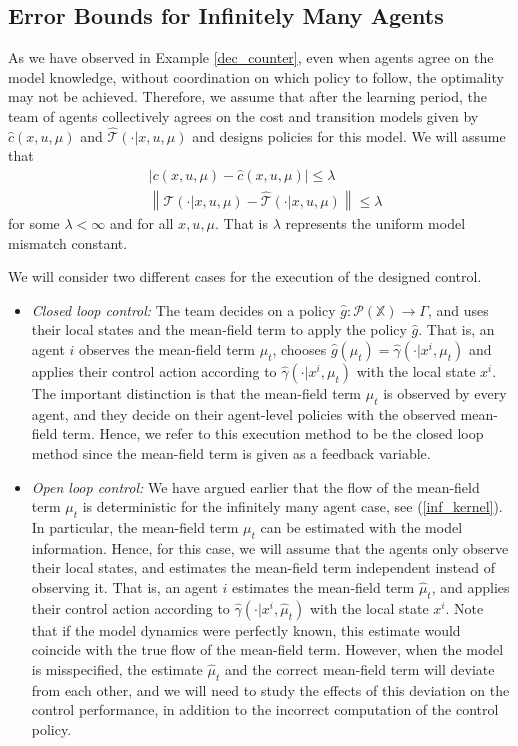 \documentclass[twoside,11pt]{article}
\def\P{{\mathcal P}}
\begin{document}
\subsection{Error Bounds for Infinitely Many Agents} 
As we have observed in Example \ref{dec_counter}, even when agents agree on the model knowledge, without coordination on which policy to follow, the optimality may not be achieved. Therefore, we assume that after the learning period, the team of agents collectively agrees on the cost and transition models given by $\hat{c}(x,u,\mu)$ and $\hat{\mathcal{T}}(\cdot|x,u,\mu)$ and
designs policies for this model. We will assume that 
\begin{align}\label{miss}
&\left|c(x,u,\mu)-\hat{c}(x,u,\mu)\right| \leq \lambda\nonumber\\
& \left\|\mathcal{T}(\cdot|x,u,\mu) - \hat{\mathcal{T}}(\cdot|x,u,\mu) \right\| \leq \lambda
\end{align}
for some $\lambda<\infty$ and for all $x,u,\mu$. That is $\lambda$ represents the uniform model mismatch constant.

We will consider two different cases for the execution of the designed control.
\begin{itemize}
\item {\it Closed loop control:} The team decides on a policy $\hat{g}:\P(\mathds{X}) \to \Gamma$, and uses their local states and the mean-field term to apply the policy $\hat{g}$. That is, an agent $i$ observes the mean-field term $\mu_t$, chooses $\hat{g}(\mu_t) = \hat{\gamma}(\cdot|x^i,\mu_t)$ and applies their control action according to $\hat{\gamma}(\cdot|x^i,\mu_t)$ with the local state $x^i$. The important distinction is that the mean-field term $\mu_t$ is observed by every agent, and they decide on their agent-level policies with the observed mean-field term. Hence, we refer to this execution method to be the closed loop method since the mean-field term is given as a feedback variable.
\item {\it Open loop control:} We have argued earlier that the flow of the mean-field term $\mu_t$ is deterministic for the infinitely many agent case, see (\ref{inf_kernel}). In particular, the mean-field term $\mu_t$ can be estimated with the model information. Hence, for this case, we will assume that the agents only observe their local states, and estimates the mean-field term independent instead of observing it. That is, an agent $i$ estimates the mean-field term $\hat{\mu}_t$, and applies their control action according to $\hat{\gamma}(\cdot|x^i,\hat{\mu}_t)$ with the local state $x^i$. Note that if the model dynamics were perfectly known, this estimate would coincide with the true flow of the mean-field term. However, when the model is misspecified, the estimate $\hat{\mu}_t$ and the correct mean-field term will deviate from each other, and we will need to study the effects of this deviation on the control performance, in addition to the incorrect computation of the control policy. 
\end{itemize}
\end{document}

